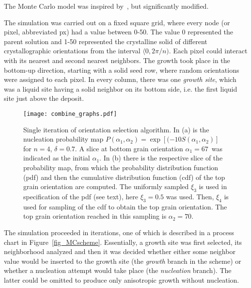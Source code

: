 The Monte Carlo model was inspired by~\cite{Li1997_1,Li1997_2}, but significantly modified. 

The simulation was carried out on a fixed square grid, where every node (or pixel, abbreviated px) had a value between 0-50. The value 0 represented the parent solution and 1-50 represented the crystalline solid of different crystallographic orientations from the interval $\langle0,2\pi/n)$. Each pixel could interact with its nearest and second nearest neighbors. The growth took place in the bottom-up direction, starting with a solid seed row, where random orientations were assigned to each pixel. In every column, there was one \textit{growth site}, which was a liquid site having a solid neighbor on its bottom side, i.e. the first liquid site just above the deposit.

\begin{figure*}
	\centering
	\texttt{[image: combine\_graphs.pdf]}
	\caption{Single iteration of orientation selection algorithm. In (a) is the nucleation probability map $P(\alpha_1,\alpha_2)=\exp[(-10S(\alpha_1,\alpha_2)]$ for $n=4$, $\delta=0.7$. A slice at bottom grain orientation $\alpha_1=67$\textdegree~was indicated as the initial $\alpha_1$. In (b) there is the respective slice of the probability map, from which the probability distribution function (pdf) and then the cumulative distribution function (cdf) of the top grain orientation are computed. The uniformly sampled $\xi_3$ is used in specification of the pdf (see text), here $\xi_3=0.5$ was used. Then, $\xi_4$ is used for sampling of the cdf to obtain the top grain orientation. The top grain orientation reached in this sampling is $\alpha_2=70$\textdegree.}
	\label{fig_MC_orientation_selection}
\end{figure*}

The simulation proceeded in iterations, one of which is described in a process chart in Figure~\ref{fig_MCscheme}. Essentially, a growth site was first selected, its neighborhood analyzed and then it was decided whether either some neighbor value would be inserted to the growth site (the \textit{growth} branch in the scheme) or whether a nucleation attempt would take place (the \textit{nucleation} branch). The latter could be omitted to produce only anisotropic growth without nucleation.

